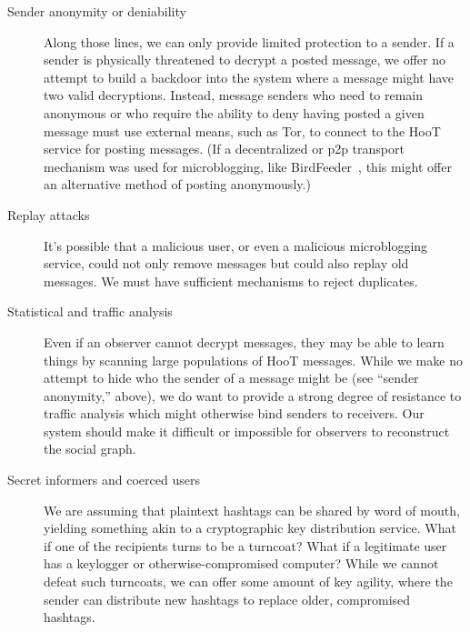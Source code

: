 \begin{description}
\item[Sender anonymity or deniability] Along those lines, we can only
  provide limited protection to a sender. If a sender is physically
  threatened to decrypt a posted message, we offer no attempt to build a
  backdoor into the system where a message might have two valid
  decryptions. Instead, message senders who need to remain anonymous or
  who require the ability to deny having posted a given message must use
  external means, such as Tor, to connect to the HooT service for
  posting messages. (If a decentralized or p2p transport mechanism was
  used for microblogging, like BirdFeeder~\cite{sandler08}, this might
  offer an alternative method of posting anonymously.)

\item[Replay attacks] It's possible that a malicious user, or even a
  malicious microblogging service, could not only remove messages but
  could also replay old messages. We must have sufficient mechanisms to
  reject duplicates.

\item[Statistical and traffic analysis] Even if an observer cannot
  decrypt messages, they may be able to learn things by scanning large
  populations of HooT messages. While we make no attempt to hide who the
  sender of a message might be (see ``sender anonymity,'' above), we do
  want to provide a strong degree of resistance to traffic analysis
  which might otherwise bind senders to receivers. Our system should
  make it difficult or impossible for observers to reconstruct the
  social graph.

\item[Secret informers and coerced users] We are assuming that plaintext
  hashtags can be shared by word of mouth, yielding something akin to a
  cryptographic key distribution service. What if one of the recipients
  turns to be a turncoat? What if a legitimate user has a keylogger or
  otherwise-compromised computer? While we cannot defeat such turncoats,
  we can offer some amount of key agility, where the sender can
  distribute new hashtags to replace older, compromised hashtags.

\end{description}
% 
% 
